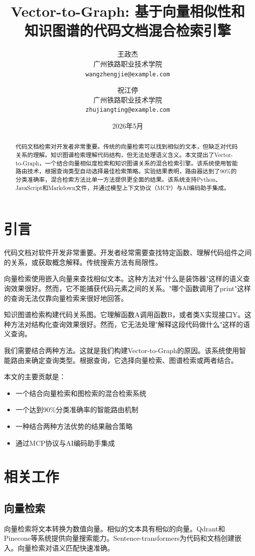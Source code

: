 \documentclass[11pt]{article}
\title{Vector-to-Graph: 基于向量相似性和知识图谱的代码文档混合检索引擎}
\author{
    王政杰 \\
    广州铁路职业技术学院 \\
    \texttt{wangzhengjie@example.com}
    \and
    祝江停 \\
    广州铁路职业技术学院 \\
    \texttt{zhujiangting@example.com}
}
\date{2026年5月}
\begin{document}
\maketitle

\begin{abstract}
代码文档检索对开发者非常重要。传统的向量检索可以找到相似的文本，但缺乏对代码关系的理解。知识图谱检索理解代码结构，但无法处理语义含义。本文提出了Vector-to-Graph，一个结合向量相似度检索和知识图谱关系的混合检索引擎。该系统使用智能路由技术，根据查询类型自动选择最佳检索策略。实验结果表明，路由器达到了90\%的分类准确率，混合检索方法比单一方法提供更全面的结果。该系统支持Python、JavaScript和Markdown文件，并通过模型上下文协议（MCP）与AI编码助手集成。
\end{abstract}

\section{引言}

代码文档对软件开发非常重要。开发者经常需要查找特定函数、理解代码组件之间的关系，或获取概念解释。传统搜索方法有局限性。

向量检索使用嵌入向量来查找相似文本。这种方法对"什么是装饰器"这样的语义查询效果很好。然而，它不能捕获代码元素之间的关系。"哪个函数调用了print"这样的查询无法仅靠向量检索来很好地回答。

知识图谱检索构建代码关系图。它理解函数A调用函数B，或者类X实现接口Y。这种方法对结构化查询效果很好。然而，它无法处理"解释这段代码做什么"这样的语义查询。

我们需要结合两种方法。这就是我们构建Vector-to-Graph的原因。该系统使用智能路由来确定查询类型。根据查询，它选择向量检索、图谱检索或两者结合。

本文的主要贡献是：

\begin{itemize}
    \item 一个结合向量检索和图检索的混合检索系统
    \item 一个达到90\%分类准确率的智能路由机制
    \item 一种结合两种方法优势的结果融合策略
    \item 通过MCP协议与AI编码助手集成
\end{itemize}

\section{相关工作}

\subsection{向量检索}
向量检索将文本转换为数值向量。相似的文本具有相似的向量。Qdrant和Pinecone等系统提供向量搜索能力。Sentence-transformers为代码和文档创建嵌入。向量检索对语义匹配快速准确。
\end{document}
